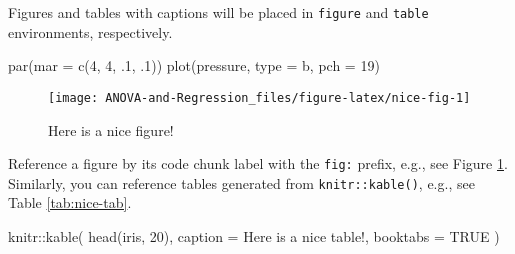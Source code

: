 \documentclass[
]{book}
\newenvironment{Shaded}{\begin{snugshade}}{\end{snugshade}}
\newcommand{\AttributeTok}[1]{\textcolor[rgb]{0.77,0.63,0.00}{#1}}
\newcommand{\ConstantTok}[1]{\textcolor[rgb]{0.00,0.00,0.00}{#1}}
\newcommand{\DecValTok}[1]{\textcolor[rgb]{0.00,0.00,0.81}{#1}}
\newcommand{\FunctionTok}[1]{\textcolor[rgb]{0.00,0.00,0.00}{#1}}
\newcommand{\NormalTok}[1]{#1}
\newcommand{\SpecialCharTok}[1]{\textcolor[rgb]{0.00,0.00,0.00}{#1}}
\newcommand{\StringTok}[1]{\textcolor[rgb]{0.31,0.60,0.02}{#1}}
\begin{document}
Figures and tables with captions will be placed in \texttt{figure} and \texttt{table} environments, respectively.

\begin{Shaded}
\begin{Highlighting}[]
\FunctionTok{par}\NormalTok{(}\AttributeTok{mar =} \FunctionTok{c}\NormalTok{(}\DecValTok{4}\NormalTok{, }\DecValTok{4}\NormalTok{, .}\DecValTok{1}\NormalTok{, .}\DecValTok{1}\NormalTok{))}
\FunctionTok{plot}\NormalTok{(pressure, }\AttributeTok{type =} \StringTok{\textquotesingle{}b\textquotesingle{}}\NormalTok{, }\AttributeTok{pch =} \DecValTok{19}\NormalTok{)}
\end{Highlighting}
\end{Shaded}

\begin{figure}

{\centering \texttt{[image: ANOVA-and-Regression\_files/figure-latex/nice-fig-1]} 

}

\caption{Here is a nice figure!}\label{fig:nice-fig}
\end{figure}

Reference a figure by its code chunk label with the \texttt{fig:} prefix, e.g., see Figure \ref{fig:nice-fig}. Similarly, you can reference tables generated from \texttt{knitr::kable()}, e.g., see Table \ref{tab:nice-tab}.

\begin{Shaded}
\begin{Highlighting}[]
\NormalTok{knitr}\SpecialCharTok{::}\FunctionTok{kable}\NormalTok{(}
  \FunctionTok{head}\NormalTok{(iris, }\DecValTok{20}\NormalTok{), }\AttributeTok{caption =} \StringTok{\textquotesingle{}Here is a nice table!\textquotesingle{}}\NormalTok{,}
  \AttributeTok{booktabs =} \ConstantTok{TRUE}
\NormalTok{)}
\end{Highlighting}
\end{Shaded}
\end{document}
